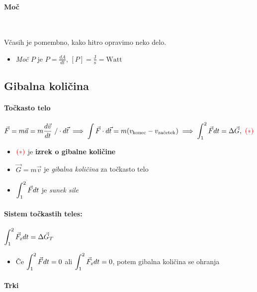 \paragraph{Moč} \ 

Včasih je pomembno, kako hitro opravimo neko delo.

\begin{itemize}
    \item \emph{Moč} \(P\) je \(P = \frac{dA}{dt}\), \([P] = \frac{\text{J}}{\text{s}} = \text{Watt}\)
\end{itemize}

\subsection{Gibalna količina}
\paragraph{Točkasto telo}
\[\vec{F} = m \vec{a} = m \frac{d \vec{v}}{dt} \ / \cdot d \vec{t} \implies \int \vec{F} \cdot d \vec{t} = m(v_\text{konec} - v_\text{začetek}) \implies \int_{1}^{2}  \vec{F} dt = \Delta \vec{G}, \ \textcolor{red}{(*)}\]
\begin{itemize}
    \item \(\textcolor{red}{(*)}\) je \textbf{izrek o gibalne količine}
    \item \(\vec{G} = m \vec{v}\) je \emph{gibalna količina} za točkasto telo
    \item \(\displaystyle \int_{1}^{2} \vec{F} dt\) je \emph{sunek sile}
\end{itemize}

\paragraph{Sistem točkastih teles: } \(\displaystyle \int_{1}^{2} \vec{F}_\text{z} dt = \Delta \vec{G}_T\)

\begin{itemize}
    \item Če \(\displaystyle \int_{1}^{2} \vec{F} dt = 0\) ali \(\displaystyle \int_{1}^{2} \vec{F}_\text{z} dt = 0\), potem gibalna količina se ohranja
\end{itemize}

\paragraph{Trki} \ 

